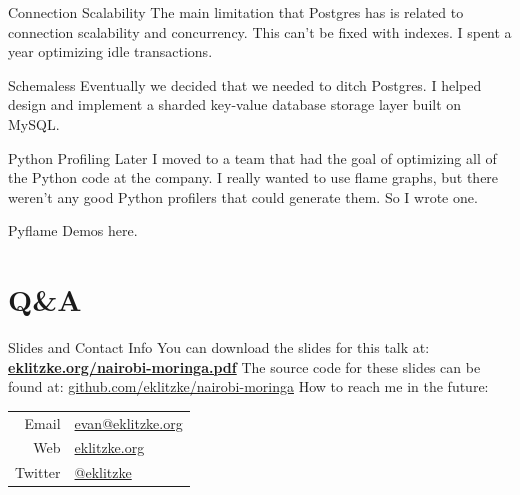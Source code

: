 \documentclass[14pt]{beamer}
\begin{document}
\begin{frame}{Connection Scalability}
  The main limitation that Postgres has is related to connection scalability and
  concurrency. This can't be fixed with indexes.
  \newline
  \newline
  I spent a year optimizing idle transactions.
\end{frame}

\begin{frame}{Schemaless}
  Eventually we decided that we needed to ditch Postgres.
  \newline
  \newline
  I helped design and implement a sharded key-value database storage layer built
  on MySQL.
\end{frame}

\begin{frame}{Python Profiling}
  Later I moved to a team that had the goal of optimizing all of the Python code
  at the company.
  \newline
  \newline
  I really wanted to use flame graphs, but there weren't any good Python
  profilers that could generate them. So I wrote one.
\end{frame}

\begin{frame}{Pyflame}
  Demos here.
\end{frame}

\section{Q{\&}A}

\begin{frame}{Slides and Contact Info}
  You can download the slides for this talk at:
  \textbf{\href{https://eklitzke.org/nairobi-moringa.pdf}{eklitzke.org/nairobi-moringa.pdf}}
  \newline
  \newline
  The source code for these slides can be found at:
  \href{https://github.com/eklitzke/nairobi-moringa}{github.com/eklitzke/nairobi-moringa}
  \newline
  \newline
  How to reach me in the future:
  \newline
  \newline
  \begin{tabular}{r | l}
    Email & \href{mailto:evan@eklitzke.org}{evan@eklitzke.org} \\
    Web & \href{https://eklitzke.org}{eklitzke.org} \\
    Twitter & \href{https://twitter.com/eklitzke}{@eklitzke} \\
  \end{tabular}
\end{frame}
\end{document}
